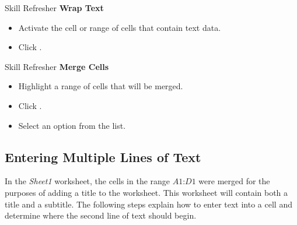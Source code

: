 \begin{center}
	\begin{sklbox}{Skill Refresher}
		\textbf{Wrap Text}
		\\
		\begin{itemize}
			\setlength{\itemsep}{0pt}
			\setlength{\parskip}{0pt}
			\setlength{\parsep}{0pt}
			
			\item Activate the cell or range of cells that contain text data.
			\item Click .

		\end{itemize}
	\end{sklbox}
\end{center}

\begin{center}
	\begin{sklbox}{Skill Refresher}
		\textbf{Merge Cells}
		\\
		\begin{itemize}
			\setlength{\itemsep}{0pt}
			\setlength{\parskip}{0pt}
			\setlength{\parsep}{0pt}
			
			\item Highlight a range of cells that will be merged.
			\item Click .
			\item Select an option from the  list.
			
		\end{itemize}
	\end{sklbox}
\end{center}

\subsection{Entering Multiple Lines of Text}

In the \textit{Sheet1} worksheet, the cells in the range $ A1 $:$ D1 $ were merged for the purposes of adding a title to the worksheet. This worksheet will contain both a title and a subtitle. The following steps explain how to enter text into a cell and determine where the second line of text should begin.

